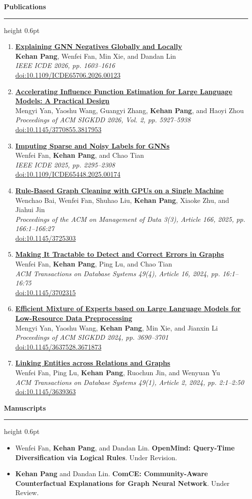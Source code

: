 \documentclass[10pt,a4paper]{article}
\newcommand{\logosection}[2]{%
  \vspace{0.7em}
  {\large\bfseries\color{heading}\makebox[1.35em][c]{#1}\hspace{0.25em}#2}\par
  \vspace{0.18em}
  {\color{rulecolor}\hrule height 0.6pt}
  \vspace{0.38em}
}
\newcommand{\publication}[4]{%
  \href{https://doi.org/#4}{\textbf{#1}}\\
  #2\\
  \textit{#3}\\[-0.1em]
  \href{https://doi.org/#4}{doi:#4}
}
\begin{document}
\logosection{\faBookOpen}{Publications}

\begin{enumerate}
  \item \publication
    {Explaining GNN Negatives Globally and Locally}
    {\textbf{Kehan Pang}, Wenfei Fan, Min Xie, and Dandan Lin}
    {IEEE ICDE 2026, pp. 1603--1616}
    {10.1109/ICDE65706.2026.00123}

  \item \publication
    {Accelerating Influence Function Estimation for Large Language Models: A Practical Design}
    {Mengyi Yan, Yaoshu Wang, Guangyi Zhang, \textbf{Kehan Pang}, and Haoyi Zhou}
    {Proceedings of ACM SIGKDD 2026, Vol. 2, pp. 5927--5938}
    {10.1145/3770855.3817953}

  \item \publication
    {Imputing Sparse and Noisy Labels for GNNs}
    {Wenfei Fan, \textbf{Kehan Pang}, and Chao Tian}
    {IEEE ICDE 2025, pp. 2295--2308}
    {10.1109/ICDE65448.2025.00174}

  \item \publication
    {Rule-Based Graph Cleaning with GPUs on a Single Machine}
    {Wenchao Bai, Wenfei Fan, Shuhao Liu, \textbf{Kehan Pang}, Xiaoke Zhu, and Jiahui Jin}
    {Proceedings of the ACM on Management of Data 3(3), Article 166, 2025, pp. 166:1--166:27}
    {10.1145/3725303}

  \item \publication
    {Making It Tractable to Detect and Correct Errors in Graphs}
    {Wenfei Fan, \textbf{Kehan Pang}, Ping Lu, and Chao Tian}
    {ACM Transactions on Database Systems 49(4), Article 16, 2024, pp. 16:1--16:75}
    {10.1145/3702315}

  \item \publication
    {Efficient Mixture of Experts based on Large Language Models for Low-Resource Data Preprocessing}
    {Mengyi Yan, Yaoshu Wang, \textbf{Kehan Pang}, Min Xie, and Jianxin Li}
    {Proceedings of ACM SIGKDD 2024, pp. 3690--3701}
    {10.1145/3637528.3671873}

  \item \publication
    {Linking Entities across Relations and Graphs}
    {Wenfei Fan, Ping Lu, \textbf{Kehan Pang}, Ruochun Jin, and Wenyuan Yu}
    {ACM Transactions on Database Systems 49(1), Article 2, 2024, pp. 2:1--2:50}
    {10.1145/3639363}
\end{enumerate}

\logosection{\faFile}{Manuscripts}

\begin{itemize}
  \item Wenfei Fan, \textbf{Kehan Pang}, and Dandan Lin.
    \textbf{OpenMind: Query-Time Diversification via Logical Rules}. Under Revision.
  \item \textbf{Kehan Pang} and Dandan Lin.
    \textbf{ComCE: Community-Aware Counterfactual Explanations for Graph Neural Network}. Under Review.
\end{itemize}
\end{document}
